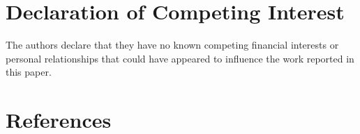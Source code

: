 \documentclass[12pt]{elsarticle} %
\begin{document}
\hypertarget{declaration-of-competing-interest}{%
\section*{Declaration of Competing Interest}\label{declaration-of-competing-interest}}

The authors declare that they have no known competing financial
interests or personal relationships that could have appeared to influence the work reported in this paper.

\newpage

\hypertarget{references}{%
\section{References}\label{references}}
\end{document}
